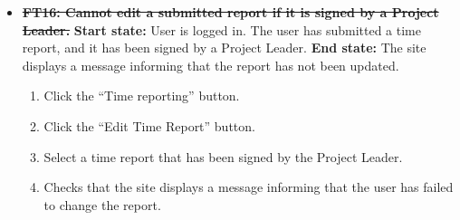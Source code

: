\documentclass{article}
\begin{document}
\begin{itemize}
		\item \sout{\textbf
{FT16: Cannot edit a submitted report if it is signed by a Project Leader.}}\newline
		\textbf{Start state:} User is logged in. The user has submitted a time report, and it has been signed by a Project Leader.    \newline
		\textbf{End state:} The site displays a message informing that the report has not been updated.
		\begin{enumerate}
			\item Click the “Time reporting” button.
			\item Click the “Edit Time Report” button.
			\item Select a time report that has been signed by the Project Leader.
			\item Checks that the site displays a message informing that the user has failed to change the report. 
		\end{enumerate} 
		
\end{itemize}
\end{document}
